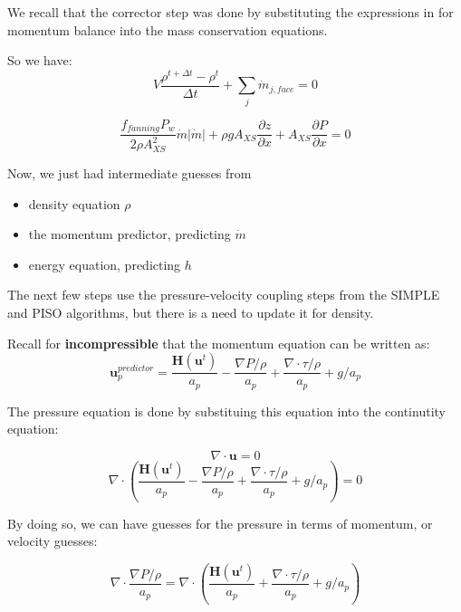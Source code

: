 \documentclass[masters]{ucbthesis}
\renewcommand{\_}{\kern-1.5pt\textunderscore\kern-1.5pt}
\begin{document}
We recall that the corrector step was done by substituting the expressions 
in for momentum balance into the mass conservation equations.


So we have:
\begin{equation*} 
	V \frac{\rho^{t + \Delta t} - \rho^t}{\Delta t} 
	+ \sum_j \dot{m}_{j, face} = 0
\end{equation*}

\begin{equation*} 
	\frac{f_{fanning} P_w}{2 \rho A_{XS}^2} \dot{m} |\dot{m}|
	+ \rho g A_{XS} \frac{\partial z}{\partial x}
	+ A_{XS} \frac{\partial P}{\partial x} = 0
\end{equation*}

Now, we just had intermediate guesses from 
\begin{itemize}
	\item density equation $\rho$
	\item the momentum predictor, predicting $\dot{m}$
	\item energy equation, predicting $h$
\end{itemize}

The next few steps use the pressure-velocity coupling steps from the 
SIMPLE and PISO algorithms, but there is a need to update it for density.

Recall for \textbf{incompressible} 
that the momentum equation can be written as:
\begin{equation*}
	\textbf{u}_p^{predictor} = 
	\frac{\textbf{H}(\textbf{u}^t)}{a_p}
	- \frac{\nabla P/\rho}{a_p}
	+ \frac{\nabla \cdot \tau /\rho}{a_p}
	+ g/a_p
\end{equation*}

The pressure equation is done by substituing this equation into 
the continutity equation:

\begin{equation*}
	\nabla \cdot \mathbf{u} = 0
\end{equation*}
\begin{equation*}
	\nabla \cdot \left(
		\frac{\textbf{H}(\textbf{u}^t)}{a_p}
		- \frac{\nabla P/\rho}{a_p}
		+ \frac{\nabla \cdot \tau /\rho}{a_p}
		+ g/a_p
	\right) = 0
\end{equation*}

By doing so, we can have guesses for the pressure in terms of momentum,
or velocity guesses:

\begin{equation*}
	\nabla \cdot \frac{\nabla P/\rho}{a_p} 
	=
	\nabla \cdot \left(
		\frac{\textbf{H}(\textbf{u}^t)}{a_p}
		+ \frac{\nabla \cdot \tau /\rho}{a_p}
		+ g/a_p
	\right) 
\end{equation*}
\end{document}
